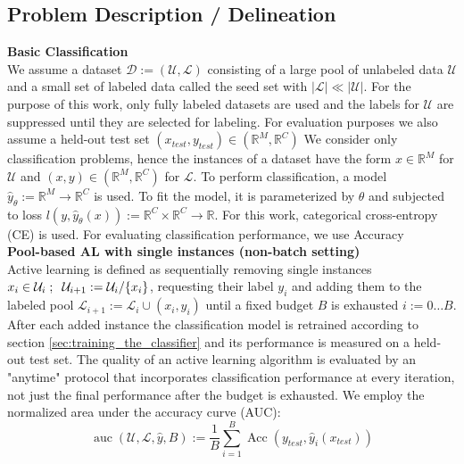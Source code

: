 \documentclass[]{article}
\begin{document}
\subsection{Problem Description / Delineation}
\textbf{Basic Classification}\\
We assume a dataset $\mathcal{D} := (\mathcal{U}, \mathcal{L})$ consisting of a large pool of unlabeled data $\mathcal{U}$ and a small set of labeled data called the seed set with $|\mathcal{L}| \ll |\mathcal{U|}$. 
For the purpose of this work, only fully labeled datasets are used and the labels for $\mathcal{U}$ are suppressed until they are selected for labeling.
For evaluation purposes we also assume a held-out test set $(x_{test}, y_{test}) \in (\mathbb{R}^M, \mathbb{R}^C)$
We consider only classification problems, hence the instances of a dataset have the form $x \in \mathbb{R}^M$ for $\mathcal{U}$ and $(x, y) \in (\mathbb{R}^M, \mathbb{R}^C)$ for $\mathcal{L}$.
To perform classification, a model $\hat y_\theta := \mathbb{R}^M \rightarrow \mathbb{R}^C$ is used. To fit the model, it is parameterized by $\theta$ and subjected to loss $l(y, \hat y_\theta(x)) := \mathbb{R}^C \times \mathbb{R}^C \rightarrow \mathbb{R}$. For this work, categorical cross-entropy (CE) is used.
For evaluating classification performance, we use Accuracy \\ [1mm]
%
\textbf{Pool-based AL with single instances (non-batch setting)}\\
Active learning is defined as sequentially removing single instances $x_i \in \mathcal{U}_i\hspace{1mm}; \hspace{2mm} \mathcal{U}_{i+1} := \mathcal{U}_i / \{x_i\}$, requesting their label $y_i$ and adding them to the labeled pool $\mathcal{L}_{i+1} := \mathcal{L}_i \cup (x_i, y_i)$ until a fixed budget $B$ is exhausted $i := 0 \ldots B$.
After each added instance the classification model is retrained according to section \ref{sec:training_the_classifier} and its performance is measured on a held-out test set.
The quality of an active learning algorithm is evaluated by an "anytime" protocol that incorporates classification performance at every iteration, not just the final performance after the budget is exhausted.
We employ the normalized area under the accuracy curve (AUC):
\begin{equation}
	\operatorname{auc}(\mathcal{U}, \mathcal{L}, \hat y, B) := \frac{1}{B} \sum_{i=1}^{B} \operatorname{Acc}(y_{test}, \hat y_i(x_{test}))
\end{equation}
\end{document}
